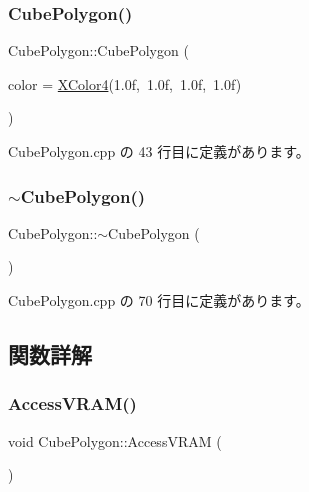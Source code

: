 \subsubsection{\texorpdfstring{Cube\+Polygon()}{CubePolygon()}}
{\footnotesize\ttfamily Cube\+Polygon\+::\+Cube\+Polygon (\begin{DoxyParamCaption}\item[{\mbox{\hyperlink{_vector3_d_8h_a680c30c4a07d86fe763c7e01169cd6cc}{X\+Color4}}}]{color = {\ttfamily \mbox{\hyperlink{_vector3_d_8h_a680c30c4a07d86fe763c7e01169cd6cc}{X\+Color4}}(1.0f,~1.0f,~1.0f,~1.0f)} }\end{DoxyParamCaption})}



 Cube\+Polygon.\+cpp の 43 行目に定義があります。

\mbox{\label{class_cube_polygon_ae6cd078c65ba32e8da56b8f7d5e92d2a}} 
\subsubsection{\texorpdfstring{$\sim$\+Cube\+Polygon()}{~CubePolygon()}}
{\footnotesize\ttfamily Cube\+Polygon\+::$\sim$\+Cube\+Polygon (\begin{DoxyParamCaption}{ }\end{DoxyParamCaption})}



 Cube\+Polygon.\+cpp の 70 行目に定義があります。



\subsection{関数詳解}
\mbox{\label{class_cube_polygon_a715db255bf7ebd3c3aec2095d73b9399}} 
\subsubsection{\texorpdfstring{Access\+V\+R\+A\+M()}{AccessVRAM()}}
{\footnotesize\ttfamily void Cube\+Polygon\+::\+Access\+V\+R\+AM (\begin{DoxyParamCaption}{ }\end{DoxyParamCaption})\hspace{0.3cm}{\ttfamily [private]}}



